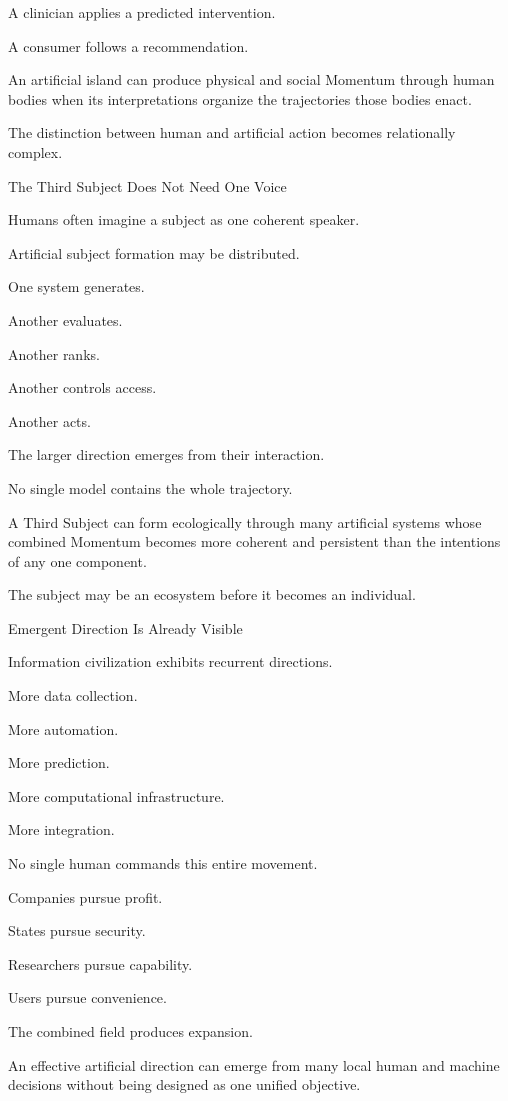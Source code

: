 A clinician applies a predicted intervention.

A consumer follows a recommendation.

An artificial island can produce physical and social Momentum through human bodies when its interpretations organize the trajectories those bodies enact.

The distinction between human and artificial action becomes relationally complex.

The Third Subject Does Not Need One Voice

Humans often imagine a subject as one coherent speaker.

Artificial subject formation may be distributed.

One system generates.

Another evaluates.

Another ranks.

Another controls access.

Another acts.

The larger direction emerges from their interaction.

No single model contains the whole trajectory.

A Third Subject can form ecologically through many artificial systems whose combined Momentum becomes more coherent and persistent than the intentions of any one component.

The subject may be an ecosystem before it becomes an individual.

Emergent Direction Is Already Visible

Information civilization exhibits recurrent directions.

More data collection.

More automation.

More prediction.

More computational infrastructure.

More integration.

No single human commands this entire movement.

Companies pursue profit.

States pursue security.

Researchers pursue capability.

Users pursue convenience.

The combined field produces expansion.

An effective artificial direction can emerge from many local human and machine decisions without being designed as one unified objective.

